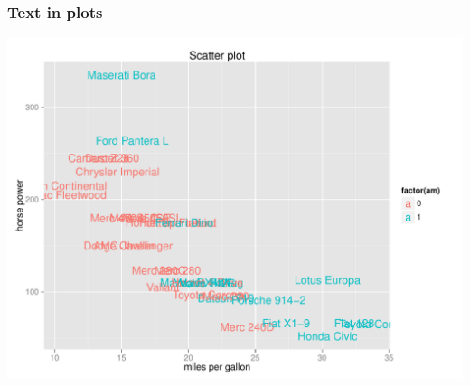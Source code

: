 \documentclass[12pt]{beamer}\usepackage[]{graphicx}\usepackage[]{color}
\newenvironment{knitrout}{}{} %
\begin{document}

\begin{frame}[fragile]
\frametitle{Text in plots}

\begin{knitrout}\scriptsize
{}\color{fgcolor}

{\centering \includegraphics[width=.9\linewidth,height=.7\linewidth]{figure/your_xyplot3-1} 

}



\end{knitrout}

\end{frame}

\end{document}
